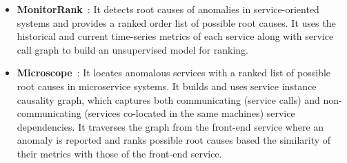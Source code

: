 \begin{itemize}
\item \textbf{MonitorRank}~\cite{cscs2013monitorRank}:
It detects root causes of anomalies in service-oriented systems and provides a ranked order list of possible root causes.
It uses the historical and current time-series metrics of each service along with service call graph to build an unsupervised model for ranking.


\item \textbf{Microscope}~\cite{ICSOC2018Microscope}:
It locates anomalous services with a ranked list of possible root causes in microservice systems.
It builds and uses service instance causality graph, which captures both communicating (service calls) and non-communicating (services co-located in the same machines) service dependencies.
It traverses the graph from the front-end service where an anomaly is reported and ranks possible root causes based the similarity of their metrics with those of the front-end service.
\end{itemize}


